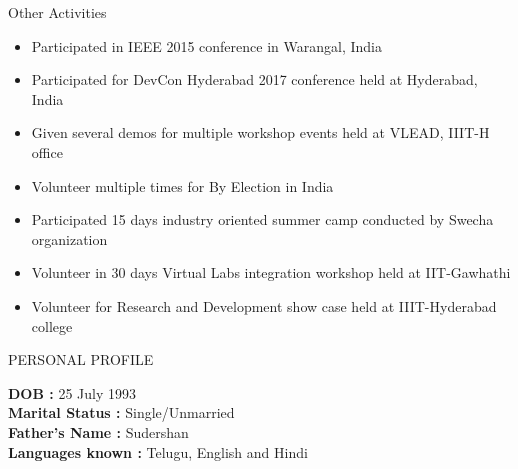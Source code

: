 \documentclass{resume} %
\begin{document}
\begin{rSection}{Other Activities}
\begin{itemize}
\item Participated in IEEE 2015 conference in Warangal, India
\item Participated for DevCon Hyderabad 2017 conference held
  at Hyderabad, India
\item Given several demos for multiple workshop events held
  at VLEAD, IIIT-H office
\item Volunteer multiple times for By Election in India
\item Participated 15 days industry oriented summer camp
  conducted by Swecha organization
\item Volunteer in 30 days Virtual Labs integration workshop
  held at IIT-Gawhathi
\item Volunteer for Research and Development show case held
  at IIIT-Hyderabad college
 
\end{itemize}
\end{rSection}


\begin{rSection}{PERSONAL PROFILE}

  \textbf {DOB :} 25 July 1993\\
  \textbf {Marital Status :} Single/Unmarried \\
  \textbf {Father's Name : } Sudershan \\
  \textbf {Languages known :} Telugu, English and Hindi \\

\end{rSection}
\end{document}
